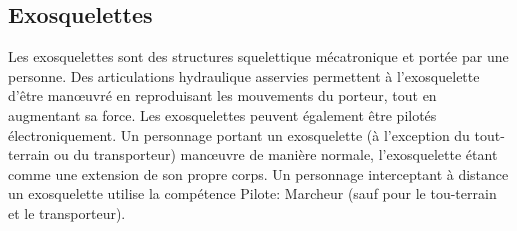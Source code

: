 \subsection{Exosquelettes} \label{sec:exoskeletons} 

Les exosquelettes sont des structures squelettique mécatronique et portée par une personne. Des articulations hydraulique asservies permettent à l'exosquelette d'être manœuvré en reproduisant les mouvements du porteur, tout en augmentant sa force. Les exosquelettes peuvent également être pilotés électroniquement. Un personnage portant un exosquelette (à l'exception du tout-terrain ou du transporteur) manœuvre de manière normale, l'exosquelette étant comme une extension de son propre corps. Un personnage interceptant à distance un exosquelette utilise la compétence Pilote: Marcheur (sauf pour le tou-terrain et le transporteur). 


